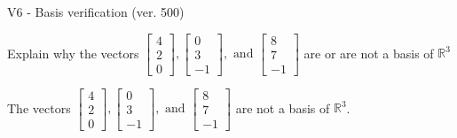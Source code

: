 \begin{exercise}
  \begin{exerciseTitle}V6 - Basis verification (ver. 500)\end{exerciseTitle}
  \begin{exerciseStatement}
    Explain why the vectors \(\left[\begin{array}{r}
4 \\
2 \\
0
\end{array}\right] , \left[\begin{array}{r}
0 \\
3 \\
-1
\end{array}\right] , \text{ and } \left[\begin{array}{r}
8 \\
7 \\
-1
\end{array}\right]\) are or are not a basis of \(\mathbb{R}^3\)	


  \end{exerciseStatement}
  \begin{exerciseAnswer}
   The vectors \(\left[\begin{array}{r}
4 \\
2 \\
0
\end{array}\right] , \left[\begin{array}{r}
0 \\
3 \\
-1
\end{array}\right] , \text{ and } \left[\begin{array}{r}
8 \\
7 \\
-1
\end{array}\right]\) 
  	 are not  a basis of \(\mathbb{R}^3\).
  


  \end{exerciseAnswer}
\end{exercise}